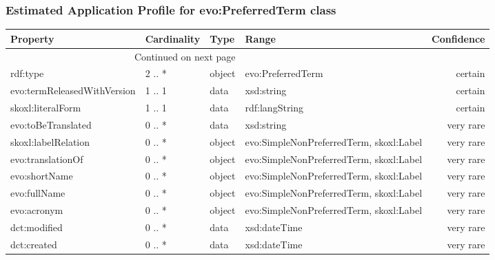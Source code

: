 \documentclass[10pt,a4paper,titlepage,final]{article}
\begin{document}
\subsubsection{Estimated Application Profile for evo:PreferredTerm class}
\begin{tabularx}{\textwidth}{lllXr}
\toprule
                    Property & Cardinality &    Type &                                    Range & Confidence \\
\midrule
\endhead
\midrule
\multicolumn{3}{r}{{Continued on next page}} \\
\midrule
\endfoot

\bottomrule
\endlastfoot
                    rdf:type &      2 .. * &  object &                        evo:PreferredTerm &    certain \\
 evo:termReleasedWithVersion &      1 .. 1 &    data &                               xsd:string &    certain \\
           skoxl:literalForm &      1 .. 1 &    data &                           rdf:langString &    certain \\
          evo:toBeTranslated &      0 .. * &    data &                               xsd:string &  very rare \\
         skoxl:labelRelation &      0 .. * &  object &  evo:SimpleNonPreferredTerm, skoxl:Label &  very rare \\
           evo:translationOf &      0 .. * &  object &  evo:SimpleNonPreferredTerm, skoxl:Label &  very rare \\
               evo:shortName &      0 .. * &  object &  evo:SimpleNonPreferredTerm, skoxl:Label &  very rare \\
                evo:fullName &      0 .. * &  object &  evo:SimpleNonPreferredTerm, skoxl:Label &  very rare \\
                 evo:acronym &      0 .. * &  object &  evo:SimpleNonPreferredTerm, skoxl:Label &  very rare \\
                dct:modified &      0 .. * &    data &                             xsd:dateTime &  very rare \\
                 dct:created &      0 .. * &    data &                             xsd:dateTime &  very rare \\
\end{tabularx}
\end{document}
